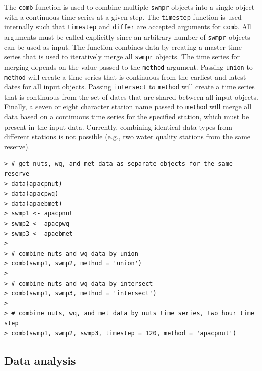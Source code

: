 \documentclass[10pt,letterpaper]{article}\usepackage[]{graphicx}\usepackage[]{color}
\makeatletter
\newenvironment{kframe}{%
 \def\at@end@of@kframe{}%
 \ifinner\ifhmode%
  \def\at@end@of@kframe{\end{minipage}}%
  \begin{minipage}{\columnwidth}%
 \fi\fi%
 \def\FrameCommand##1{\hskip\@totalleftmargin \hskip-\fboxsep
 \colorbox{shadecolor}{##1}\hskip-\fboxsep
     \hskip-\linewidth \hskip-\@totalleftmargin \hskip\columnwidth}%
 \MakeFramed {\advance\hsize-\width
   \@totalleftmargin\z@ \linewidth\hsize
   \@setminipage}}%
 {\par\unskip\endMakeFramed%
 \at@end@of@kframe}
\newenvironment{knitrout}{}{} %
\makeatother
\begin{document}
The \texttt{comb} function is used to combine multiple \texttt{swmpr} objects into a single object with a continuous time series at a given step.  The \texttt{timestep} function is used internally such that \texttt{timestep} and \texttt{differ} are accepted arguments for \texttt{comb}.  All arguments must be called explicitly since an arbitrary number of \texttt{swmpr} objects can be used as input.  The function combines data by creating a master time series that is used to iteratively merge all \texttt{swmpr} objects.  The time series for merging depends on the value passed to the \texttt{method} argument.  Passing \texttt{union} to \texttt{method} will create a time series that is continuous from the earliest and latest dates for all input objects.  Passing \texttt{intersect} to \texttt{method} will create a time series that is continuous from the set of dates that are shared between all input objects.  Finally, a seven or eight character station name passed to \texttt{method} will merge all data based on a continuous time series for the specified station, which must be present in the input data.  Currently, combining identical data types from different stations is not possible (e.g., two water quality stations from the same reserve).  

\begin{knitrout}
\color{fgcolor}\begin{kframe}
\begin{verbatim}
> # get nuts, wq, and met data as separate objects for the same reserve
> data(apacpnut)
> data(apacpwq)
> data(apaebmet)
> swmp1 <- apacpnut
> swmp2 <- apacpwq
> swmp3 <- apaebmet
> 
> # combine nuts and wq data by union
> comb(swmp1, swmp2, method = 'union')
> 
> # combine nuts and wq data by intersect
> comb(swmp1, swmp3, method = 'intersect')
> 
> # combine nuts, wq, and met data by nuts time series, two hour time step
> comb(swmp1, swmp2, swmp3, timestep = 120, method = 'apacpnut')
\end{verbatim}
\end{kframe}
\end{knitrout}

\subsection*{Data analysis}
\end{document}
